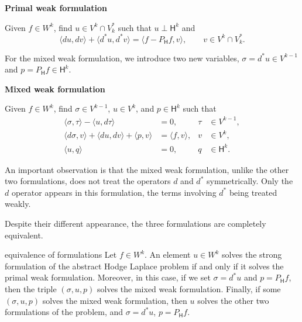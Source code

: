 \medskip\noindent\textbf{{Primal weak formulation}}\par
{Given $f\in W^k$, find $u\in V^k\cap V_k^*$ such that $u\perp\mathsf H^k$ and}
\begin{equation}\label{eq:hodge-primal-formulation}
\langle du,dv\rangle+\langle d^*u,d^*v\rangle=\langle f-P_{\mathsf H}f,v\rangle,\qquad v\in V^k\cap V_k^*.
\end{equation}

{For the mixed weak formulation, we introduce two new variables, $\sigma=d^*u\in V^{k-1}$ and $p=P_{\mathsf H}f\in\mathsf H^k$.}

\medskip\noindent\textbf{{Mixed weak formulation}}\par
{Given $f\in W^k$, find $\sigma\in V^{k-1}$, $u\in V^k$, and $p\in\mathsf H^k$ such that}
\begin{equation}\label{eq:hodge-mixed-formulation}
\begin{aligned}
\langle\sigma,\tau\rangle-\langle u,d\tau\rangle&=0,&\tau&\in V^{k-1},\\
\langle d\sigma,v\rangle+\langle du,dv\rangle+\langle p,v\rangle&=\langle f,v\rangle,&v&\in V^k,\\
\langle u,q\rangle&=0,&q&\in\mathsf H^k.
\end{aligned}
\end{equation}

{An important observation is that the mixed weak formulation, unlike the other two formulations, does not treat the operators $d$ and $d^*$ symmetrically. Only the $d$ operator appears in this formulation, the terms involving $d^*$ being treated weakly.}

{Despite their different appearance, the three formulations are completely equivalent.}

\begin{Theorem}{{equivalence of formulations}}\label{thm:hodge-formulation-equivalence}
{Let $f\in W^k$. An element $u\in W^k$ solves the strong formulation of the abstract Hodge Laplace problem if and only if it solves the primal weak formulation. Moreover, in this case, if we set $\sigma=d^*u$ and $p=P_{\mathsf H}f$, then the triple $(\sigma,u,p)$ solves the mixed weak formulation. Finally, if some $(\sigma,u,p)$ solves the mixed weak formulation, then $u$ solves the other two formulations of the problem, and $\sigma=d^*u$, $p=P_{\mathsf H}f$.}
\end{Theorem}

